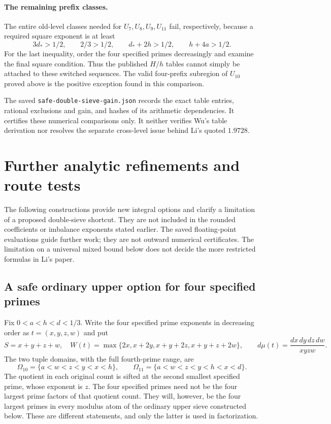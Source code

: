 \documentclass[11pt]{article}
\begin{document}
\paragraph{The remaining prefix classes.}
The entire old-level classes needed for $U_7,U_8,U_9,U_{11}$ fail,
respectively, because a required square exponent is at least
\[
 3d_*>1/2,\qquad 2/3>1/2,\qquad
 d_*+2h>1/2,\qquad h+4a>1/2.
\]
For the last inequality, order the four specified primes decreasingly
and examine the final square condition.  Thus the published $H/h$
tables cannot simply be attached to these switched sequences.
The valid four-prefix subregion of $U_{10}$ proved above is the
positive exception found in this comparison.

The saved \texttt{safe-double-sieve-gain.json} records the exact table
entries, rational exclusions and gain, and hashes of its arithmetic
dependencies.  It certifies these numerical comparisons only.
It neither verifies Wu's table derivation nor resolves the separate
cross-level issue behind Li's quoted $1.9728$.

\section{Further analytic refinements and route tests}
The following constructions provide new integral options and clarify a
limitation of a proposed double-sieve shortcut. They are not included
in the rounded coefficients or imbalance exponents stated earlier.
The saved floating-point evaluations guide further work; they are not
outward numerical certificates. The limitation on a universal mixed
bound below does not decide the more restricted formulas in Li's paper.


\subsection{A safe ordinary upper option for four specified primes}
\label{sec:four-prefix-safe-minimum}

Fix $0<a<h<d<1/3$.  Write the four specified prime exponents in
decreasing order as $t=(x,y,z,w)$ and put
\[
 S=x+y+z+w,\quad
 W(t)=\max\{2x,x+2y,x+y+2z,x+y+z+2w\},
 \qquad d\mu(t)=\frac{dx\,dy\,dz\,dw}{xyzw}.
\]
The two tuple domains, with the full fourth-prime range, are
\[
 \Omega_{10}=\{a<w<z<y<x<h\},\qquad
 \Omega_{11}=\{a<w<z<y<h<x<d\}.
\]
The quotient in each original count is sifted at the second smallest
specified prime, whose exponent is $z$.  The four specified primes
need not be the four largest prime factors of that quotient count.
They will, however, be the four largest primes in every modulus atom
of the ordinary upper sieve constructed below.  These are different
statements, and only the latter is used in factorization.
\end{document}
